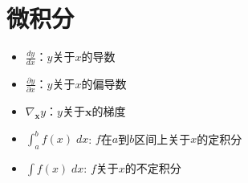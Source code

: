 \documentclass[letterpaper,10pt,english]{sphinxmanual}
\begin{document}
\section{微积分}
\label{\detokenize{chapter_notation/index:id5}}\begin{itemize}
\item {} 
\sphinxAtStartPar
\(\frac{dy}{dx}\)：\(y\)关于\(x\)的导数

\item {} 
\sphinxAtStartPar
\(\frac{\partial y}{\partial x}\)：\(y\)关于\(x\)的偏导数

\item {} 
\sphinxAtStartPar
\(\nabla_{\mathbf{x}} y\)：\(y\)关于\(\mathbf{x}\)的梯度

\item {} 
\sphinxAtStartPar
\(\int_a^b f(x) \;dx\):
\(f\)在\(a\)到\(b\)区间上关于\(x\)的定积分

\item {} 
\sphinxAtStartPar
\(\int f(x) \;dx\): \(f\)关于\(x\)的不定积分

\end{itemize}
\end{document}
